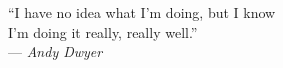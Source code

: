 \thispagestyle{empty}
{}

\vspace*{3cm}







\begin{flushright}
    ``I have no idea what I'm doing, but I know\\I'm doing it really, really well.''\\
    \medskip
    --- \textit{Andy Dwyer}
\end{flushright}

